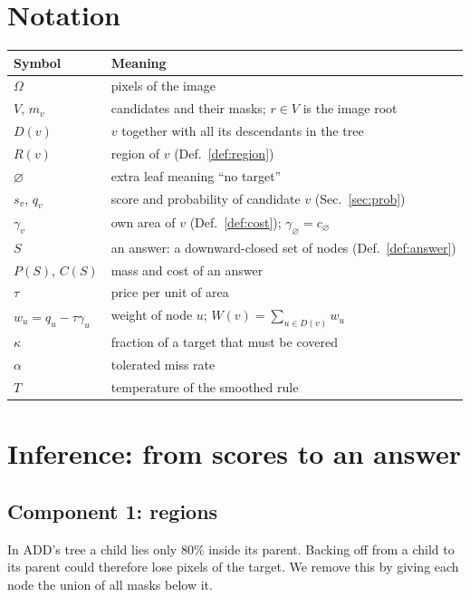 \documentclass[11pt,a4paper]{article}
\theoremstyle{definition}
\theoremstyle{remark}
\newcommand{\nul}{\varnothing}
\begin{document}
\section{Notation}
\begin{center}
\begin{tabular}{ll}
\toprule
Symbol & Meaning \\
\midrule
$\Omega$ & pixels of the image \\
$V$, $m_v$ & candidates and their masks; $r\in V$ is the image root \\
$D(v)$ & $v$ together with all its descendants in the tree \\
$R(v)$ & region of $v$ (Def.~\ref{def:region}) \\
$\nul$ & extra leaf meaning ``no target'' \\
$s_v$, $q_v$ & score and probability of candidate $v$ (Sec.~\ref{sec:prob}) \\
$\gamma_v$ & own area of $v$ (Def.~\ref{def:cost}); $\gamma_\nul=c_\nul$ \\
$S$ & an answer: a downward-closed set of nodes (Def.~\ref{def:answer}) \\
$P(S)$, $C(S)$ & mass and cost of an answer \\
$\tau$ & price per unit of area \\
$w_u=q_u-\tau\gamma_u$ & weight of node $u$; $W(v)=\sum_{u\in D(v)}w_u$ \\
$\kappa$ & fraction of a target that must be covered \\
$\alpha$ & tolerated miss rate \\
$T$ & temperature of the smoothed rule \\
\bottomrule
\end{tabular}
\end{center}

\section{Inference: from scores to an answer}
\subsection{Component 1: regions}
In ADD's tree a child lies only 80\% inside its parent. Backing off from a child to its parent could therefore lose
pixels of the target. We remove this by giving each node the union of all masks below it.
\end{document}
